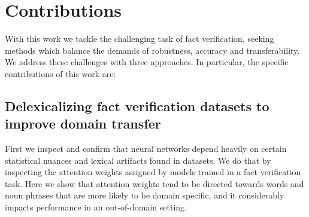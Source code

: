  

 
 
 \section{Contributions}
 
 With this work we tackle the challenging task of fact verification, seeking methods which balance the demands of robustness, accuracy and transferability. We address these challenges with three approaches. In particular, the specific contributions of this work are:
 
 
 \subsection{Delexicalizing fact verification datasets to improve domain transfer }
 
  First we inspect and confirm that neural networks depend heavily on certain statistical nuances and lexical artifacts found in  datasets. We do that by inspecting the attention weights assigned by models trained in a fact verification task. Here we show that attention weights tend to be directed towards words and noun phrases that are more likely to be domain specific, and it considerably
impacts performance in an out-of-domain setting.

